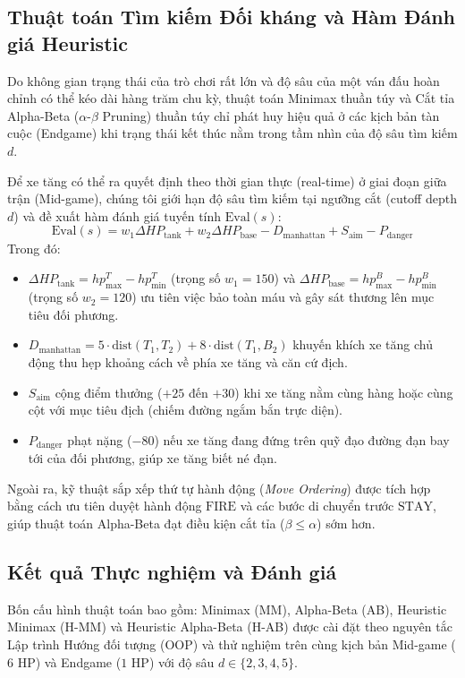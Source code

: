 \subsection{Thuật toán Tìm kiếm Đối kháng và Hàm Đánh giá Heuristic}
Do không gian trạng thái của trò chơi rất lớn và độ sâu của một ván đấu hoàn chỉnh có thể kéo dài hàng trăm chu kỳ, thuật toán Minimax thuần túy và Cắt tỉa Alpha-Beta ($\alpha$-$\beta$ Pruning) thuần túy chỉ phát huy hiệu quả ở các kịch bản tàn cuộc (Endgame) khi trạng thái kết thúc nằm trong tầm nhìn của độ sâu tìm kiếm $d$. 

Để xe tăng có thể ra quyết định theo thời gian thực (real-time) ở giai đoạn giữa trận (Mid-game), chúng tôi giới hạn độ sâu tìm kiếm tại ngưỡng cắt (cutoff depth $d$) và đề xuất hàm đánh giá tuyến tính $\text{Eval}(s)$:
\begin{equation}
\text{Eval}(s) = w_1 \Delta HP_{\text{tank}} + w_2 \Delta HP_{\text{base}} - D_{\text{manhattan}} + S_{\text{aim}} - P_{\text{danger}}
\end{equation}
Trong đó:
\begin{itemize}
    \item $\Delta HP_{\text{tank}} = hp^T_{\text{max}} - hp^T_{\text{min}}$ (trọng số $w_1 = 150$) và $\Delta HP_{\text{base}} = hp^B_{\text{max}} - hp^B_{\text{min}}$ (trọng số $w_2 = 120$) ưu tiên việc bảo toàn máu và gây sát thương lên mục tiêu đối phương.
    \item $D_{\text{manhattan}} = 5 \cdot \text{dist}(T_1, T_2) + 8 \cdot \text{dist}(T_1, B_2)$ khuyến khích xe tăng chủ động thu hẹp khoảng cách về phía xe tăng và căn cứ địch.
    \item $S_{\text{aim}}$ cộng điểm thưởng ($+25$ đến $+30$) khi xe tăng nằm cùng hàng hoặc cùng cột với mục tiêu địch (chiếm đường ngắm bắn trực diện).
    \item $P_{\text{danger}}$ phạt nặng ($-80$) nếu xe tăng đang đứng trên quỹ đạo đường đạn bay tới của đối phương, giúp xe tăng biết né đạn.
\end{itemize}
Ngoài ra, kỹ thuật sắp xếp thứ tự hành động (\textit{Move Ordering}) được tích hợp bằng cách ưu tiên duyệt hành động $\text{FIRE}$ và các bước di chuyển trước $\text{STAY}$, giúp thuật toán Alpha-Beta đạt điều kiện cắt tỉa ($\beta \le \alpha$) sớm hơn.

\subsection{Kết quả Thực nghiệm và Đánh giá}
Bốn cấu hình thuật toán bao gồm: Minimax (MM), Alpha-Beta (AB), Heuristic Minimax (H-MM) và Heuristic Alpha-Beta (H-AB) được cài đặt theo nguyên tắc Lập trình Hướng đối tượng (OOP) và thử nghiệm trên cùng kịch bản Mid-game ($6\text{ HP}$) và Endgame ($1\text{ HP}$) với độ sâu $d \in \{2, 3, 4, 5\}$.

